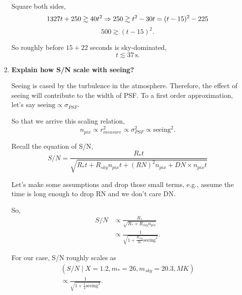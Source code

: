 \documentclass[12pt,letterpaper]{article}
\begin{document}
\begin{enumerate}
    Square both sides,
    \begin{equation*}
        1327t + 250 \gtrsim 40 t^2 \\
        \Rightarrow 250 \gtrsim t^2 - 30t = (t - 15)^2 - 225
    \end{equation*}
    \begin{equation*}
        500 \gtrsim (t - 15)^2.
    \end{equation*}

    So roughly before $15 + 22$ seconds is sky-dominated,
    \begin{equation}
        t \lesssim 37 \, \mathrm{s}.
    \end{equation}


    \item {\bf Explain how S/N scale with seeing?}
    
    Seeing is cased by the turbulence in the atmosphere.
    Therefore, the effect of seeing will contribute to the width of PSF.
    To a first order approximation, let's say $\mathrm{seeing} \propto \sigma_{PSF}$.

    So that we arrive this scaling relation,
    \begin{equation}
        n_{pix} \propto r_{measure}^2 
            \propto \sigma_{PSF}^2 
            \propto \mathrm{seeing}^2.
    \end{equation}

    Recall the equation of S/N,
    \begin{equation}
        S/N = \frac{ R_* t }{ \sqrt{ R_* t + R_{sky} n_{pix} t + (RN)^2 n_{pix} + DN\times n_{pix} t } }
    \end{equation}

    Let's make some assumptions and drop those small terms, e.g., 
    assume the time is long enough to drop RN and we don't care DN.

    So,
    \begin{equation}
        \begin{split}
            S/N &\propto \frac{ R_* }{ \sqrt{ R_* + R_{sky} n_{pix} } }\\
                &\propto \frac{1}{\sqrt{ 1 + \frac{R_{sky}}{R_*} \mathrm{seeing}^2 }}.
        \end{split}
    \end{equation}

    For our case, S/N roughly scales as 
    \begin{equation}
        \begin{split}
            (S/N \mid X=1.2, m_*=26, m_{sky}=20.3, MK)\\
                 \propto \frac{1}{\sqrt{ 1 + \frac{1}{4} \mathrm{seeing}^2 }}.
        \end{split}
    \end{equation}


\end{enumerate}
\end{document}
